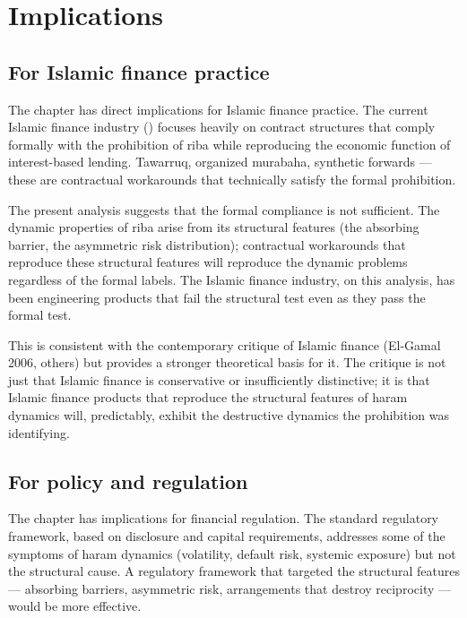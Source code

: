 \section{Implications}
\label{sec:halal-implications}

\subsection{For Islamic finance practice}

The chapter has direct implications for Islamic finance practice.
The current Islamic finance industry ()
focuses heavily on contract structures that comply formally with
the prohibition of riba while reproducing the economic function of
interest-based lending. Tawarruq, organized murabaha, synthetic
forwards --- these are contractual workarounds that technically
satisfy the formal prohibition.

The present analysis suggests that the formal compliance is not
sufficient. The dynamic properties of riba arise from its
structural features (the absorbing barrier, the asymmetric risk
distribution); contractual workarounds that reproduce these
structural features will reproduce the dynamic problems regardless
of the formal labels. The Islamic finance industry, on this
analysis, has been engineering products that fail the structural
test even as they pass the formal test.

This is consistent with the contemporary critique of Islamic
finance (El-Gamal 2006, others) but provides a stronger
theoretical basis for it. The critique is not just that Islamic
finance is conservative or insufficiently distinctive; it is that
Islamic finance products that reproduce the structural features of
haram dynamics will, predictably, exhibit the destructive dynamics
the prohibition was identifying.

\subsection{For policy and regulation}

The chapter has implications for financial regulation. The
standard regulatory framework, based on disclosure and capital
requirements, addresses some of the symptoms of haram dynamics
(volatility, default risk, systemic exposure) but not the
structural cause. A regulatory framework that targeted the
structural features --- absorbing barriers, asymmetric risk,
arrangements that destroy reciprocity --- would be more effective.

